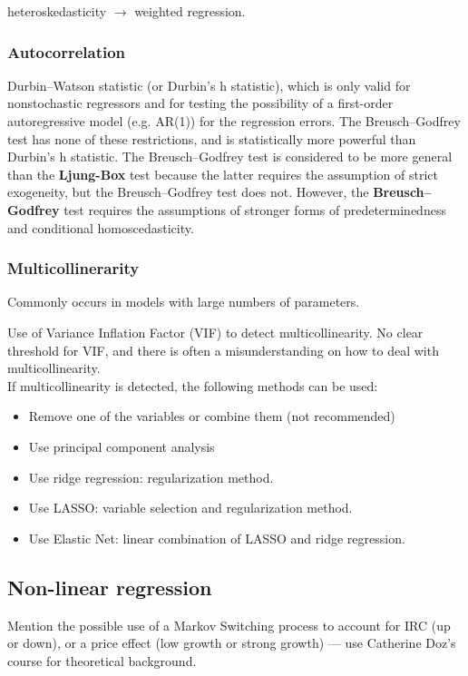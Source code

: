 heteroskedasticity $\rightarrow$ weighted regression.

\subsubsection{Autocorrelation}
Durbin–Watson statistic (or Durbin's h statistic), which is only valid for nonstochastic regressors and for testing the possibility of a first-order autoregressive model (e.g. AR(1)) for the regression errors. The Breusch–Godfrey test has none of these restrictions, and is statistically more powerful than Durbin's h statistic. The Breusch–Godfrey test is considered to be more general than the \textbf{Ljung-Box} test because the latter requires the assumption of strict exogeneity, but the Breusch–Godfrey test does not. However, the \textbf{Breusch–Godfrey} test requires the assumptions of stronger forms of predeterminedness and conditional homoscedasticity.

\subsubsection{Multicollinerarity}
Commonly occurs in models with large numbers of parameters.

Use of Variance Inflation Factor (VIF) to detect multicollinearity. No clear threshold for VIF, and there is often a misunderstanding on how to deal with multicollinearity. \\

If multicollinearity is detected, the following methods can be used:
\begin{itemize}
    \item Remove one of the variables or combine them (not recommended)
    \item Use principal component analysis
    \item Use ridge regression: regularization method.
    \item Use LASSO: variable selection and regularization method.
    \item Use Elastic Net: linear combination of LASSO and ridge regression.
\end{itemize}

\subsection{Non-linear regression}
Mention the possible use of a Markov Switching process to account for IRC (up or down), or a price effect (low growth or strong growth) — use Catherine Doz's course for theoretical background.

